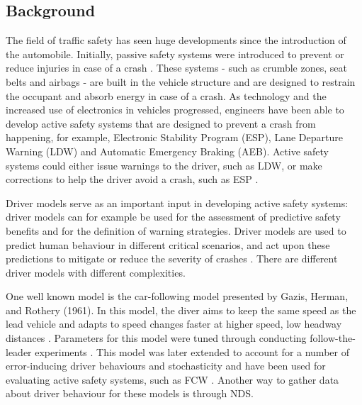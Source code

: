 \subsection{Background}

The field of traffic safety has seen huge developments since the introduction of the automobile. Initially, passive safety systems were introduced to prevent or reduce injuries in case of a crash \cite{bishop2005intelligent}. These systems - such as crumble zones, seat belts and airbags - are built in the vehicle structure and are designed to restrain the occupant and absorb energy in case of a crash. As technology and the increased use of electronics in vehicles progressed, engineers have been able to develop active safety systems that are designed to prevent a crash from happening, for example, Electronic Stability Program (ESP), Lane Departure Warning (LDW) and Automatic Emergency Braking (AEB). Active safety systems could either issue warnings to the driver, such as LDW, or make corrections to help the driver avoid a crash, such as ESP \cite{bishop2005intelligent}.  

Driver models serve as an important input in developing active safety systems: driver models can for example be used for the assessment of predictive safety benefits and for the definition of warning strategies. Driver models are used to predict human behaviour in different critical scenarios, and act upon these predictions to mitigate or reduce the severity of crashes \cite{bargman2017counterfactual}. There are different driver models with different complexities. 

One well known model is the 
car-following model presented by Gazis, Herman, and
Rothery (1961). In this model, the diver aims to keep the same speed as the  lead vehicle and adapts to speed changes faster at higher speed, low headway distances . Parameters for this model were tuned through conducting follow-the-leader experiments \cite{bexelius1968extended}. This model was later extended to account for a number of error-inducing driver behaviours and stochasticity and have been used for evaluating active safety systems, such as FCW \cite{markkula2012review}. Another way to gather data about driver behaviour for these models is through NDS.

